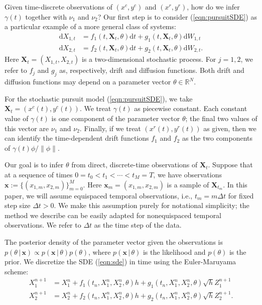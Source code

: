 \documentclass[graybox]{svmult}
\begin{document}
Given time-discrete observations of
$(x^{c},y^{c})$ and $(x^{r},y^{r})$, how do we infer $\gamma(t)$
together with $\nu_1$ and $\nu_2$?  Our first step is to consider
(\ref{eqn:pursuitSDE}) as a particular example of a more general class of systems:
\begin{subequations}
\label{eqn:sde}
\begin{align}
\mathrm{d}X_{1,t} &= f_1(t, \mathbf{X}_t, \theta)\mathrm{d}t + g_1(t, \mathbf{X}_t, \theta) \mathrm{d}W_{1,t} \\
\mathrm{d}X_{2,t} &= f_2(t, \mathbf{X}_t, \theta)\mathrm{d}t + g_2(t, \mathbf{X}_t, \theta) \mathrm{d}W_{2,t}.
\end{align}
\end{subequations}
Here $\mathbf{X}_t = (X_{1,t}, X_{2,t})$ is a two-dimensional
stochastic process. For $j=1, 2$, we refer to $f_j$ and $g_j$ as,
respectively, drift and diffusion functions.  Both
drift and diffusion functions may depend on a parameter vector
$\theta \in \mathbb{R}^{N}$.

For the stochastic pursuit model (\ref{eqn:pursuitSDE}), we take
$\mathbf{X}_t = (x^{c}(t), y^{c}(t))$.  We treat $\gamma(t)$ as
piecewise constant.  Each constant value of $\gamma(t)$ is one
component of the parameter vector $\theta$; the final two
values of this vector are $\nu_1$ and $\nu_2$.  Finally, if we treat
$(x^{r}(t), y^{r}(t))$ as given, then we can identify the time-dependent drift
functions $f_1$ and $f_2$ as the two components of $ \gamma(t) \phi /
\| \phi \|$. 

Our goal is to infer $\theta$ from direct, discrete-time observations of $\mathbf{X}_t$.  Suppose that at a sequence of times $0 = t_0 < t_1 < \cdots < t_M = T$, we have observations $\mathbf{x} := \{({x}_{1,m},{x}_{2,m})\}_{m=0}^M$.  Here $\mathbf{x}_m = ({x}_{1,m},{x}_{2,m})$ is a sample of $\mathbf{X}_{t_m}$.  In this paper, we will assume equispaced temporal observations, i.e., $t_m = m \Delta t$ for fixed step size $\Delta t > 0$.  We make this assumption purely for notational simplicity; the method we describe can be easily adapted for nonequispaced temporal observations.  We refer to $\Delta t$ as the time step of the data.

The posterior density of the parameter vector given the observations is
$p(\theta \, | \, \mathbf{x})  \propto p( \mathbf{x} \, | \, \theta)  p(\theta)$,
where $p( \mathbf{x} \, | \, \theta)$ is the likelihood and $p(\theta)$ is the prior.  We discretize the SDE (\ref{eqn:sde}) in time using the Euler-Maruyama scheme:
\begin{subequations}
\label{eqn:discretesde}
\begin{align}
X_1^{n+1} &= X_1^{n} + f_1(t_n, X_1^n, X_2^n, \theta)h + g_1(t_n, X_1^n, X_2^n,  \theta) \sqrt{h} Z_1^{n+1} \\
X_2^{n+1} &= X_2^{n} + f_2(t_n, X_1^n, X_2^n,\theta)h + g_2(t_n, X_1^n, X_2^n,\theta) \sqrt{h} Z_2^{n+1}.
\end{align}
\end{subequations}
\end{document}

